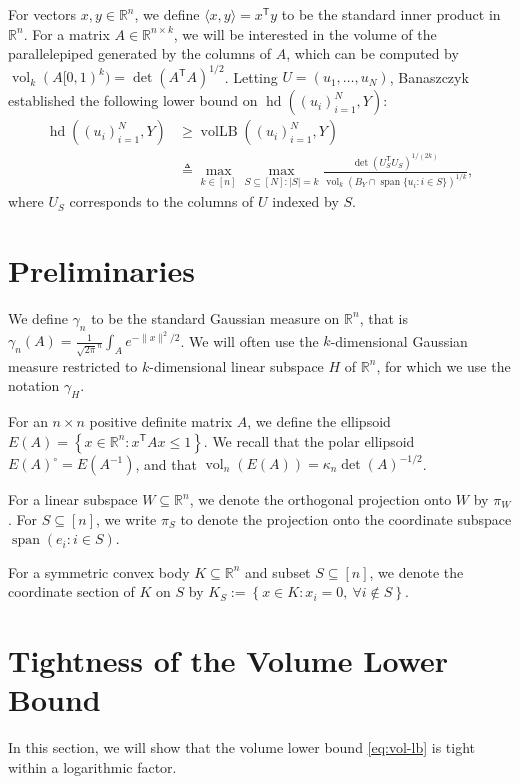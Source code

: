 \documentclass[12pt]{article}
\newcommand{\R}{{\mathbb{R}}}
\newcommand{\T}{\mathsf T}
\newcommand{\eqdef}{\triangleq}
\newcommand{\inner}[2]{\langle #1, #2 \rangle}
\newcommand{\set}[1]{\left\{ #1 \right\}}
\DeclareMathOperator{\vollb}{volLB}
\DeclareMathOperator{\hd}{hd}
\DeclareMathOperator{\vol}{vol}
\DeclareMathOperator{\lspan}{span}
\begin{document}
For vectors $x,y \in \R^n$, we define $\inner{x}{y} = x^\T y$ to be the standard
inner product in $\R^n$. For a matrix $A \in \R^{n \times k}$, we will be
interested in the volume of the parallelepiped generated by the columns of $A$,
which can be computed by $\vol_k(A[0,1)^k) = \det(A^\T A)^{1/2}$.  Letting $U =
(u_1,\dots,u_N)$, Banaszczyk~\cite{Bana93} established the following lower bound
on $\hd((u_i)_{i = 1}^N, Y)$:
\begin{equation}
  \label{eq:vol-lb}
\begin{split}
  \hd((u_i)_{i = 1}^N, Y) &\ge \vollb((u_i)_{i = 1}^N, Y) \\
                          &\eqdef
  \max_{k \in [n]} \max_{S \subseteq [N]: |S| = k}
\frac{\det(U_S^\T U_S)^{1/(2k)}}{\vol_{k}(B_Y \cap
\lspan\{u_i: i \in S\})^{1/k}},
\end{split}
\end{equation}
where $U_S$ corresponds to the columns of $U$ indexed by $S$.

\section{Preliminaries}

We define $\gamma_n$ to be the standard Gaussian measure on $\R^n$, that is
$\gamma_n(A) = \frac{1}{\sqrt{2\pi}^n} \int_A e^{-\|x\|^2/2}$. We will often use
the $k$-dimensional Gaussian measure restricted to $k$-dimensional linear
subspace $H$ of $\R^n$, for which we use the notation $\gamma_H$.

For an $n \times n$ positive definite matrix $A$, we define the ellipsoid $E(A)
= \set{x \in \R^n: x^\T A x \leq 1}$. We recall that the polar ellipsoid
$E(A)^\circ = E(A^{-1})$, and that $\vol_n(E(A)) = \kappa_n \det(A)^{-1/2}$.

For a linear subspace $W \subseteq \R^n$, we denote the orthogonal projection
onto $W$ by $\pi_W$. For $S \subseteq [n]$, we write $\pi_S$ to denote the
projection onto the coordinate subspace $\lspan(e_i: i \in S)$.

For a symmetric convex body $K \subseteq \R^n$ and subset $S \subseteq [n]$, we
denote the coordinate section of $K$ on $S$ by $K_S := \set{x \in K: x_i = 0,
~\forall i \notin S}$.

\section{Tightness of the Volume Lower Bound}

In this section, we will show that the volume lower bound \eqref{eq:vol-lb} is
tight within a logarithmic factor. 
\end{document}
